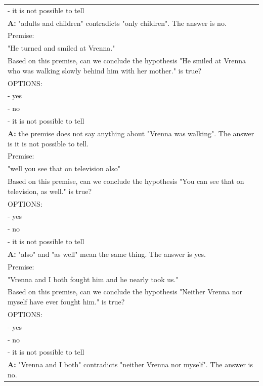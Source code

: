 \begin{table}[h]
\begin{tabular}{p{14cm}}
        - it is not possible to tell\\
        \vspace{-1mm}
        \textbf{A:} "adults and children" contradicts "only children". The answer is no.\\
        \vspace{0mm}
        Premise:\\
        "He turned and smiled at Vrenna."\\
        Based on this premise, can we conclude the hypothesis "He smiled at Vrenna who was walking slowly behind him with her mother." is true?\\
        OPTIONS:\\
        - yes\\
        - no\\
        - it is not possible to tell\\
        \vspace{-1mm}
        \textbf{A:} the premise does not say anything about "Vrenna was walking". The answer is it is not possible to tell.\\
        \vspace{0mm}
        Premise:\\
        "well you see that on television also"\\
        Based on this premise, can we conclude the hypothesis "You can see that on television, as well." is true?\\
        OPTIONS:\\
        - yes\\
        - no\\
        - it is not possible to tell\\
        \vspace{-1mm}
        \textbf{A:} "also" and "as well" mean the same thing. The answer is yes.\\
        \vspace{0mm}
        Premise:\\
        "Vrenna and I both fought him and he nearly took us."\\
        Based on this premise, can we conclude the hypothesis "Neither Vrenna nor myself have ever fought him." is true?\\
        OPTIONS:\\
        - yes\\
        - no\\
        - it is not possible to tell\\
        \vspace{-1mm}
        \textbf{A:} "Vrenna and I both" contradicts "neither Vrenna nor myself". The answer is no.\\
        \bottomrule
    \end{tabular}
    \label{tab:prompt-nli}
\end{table}


